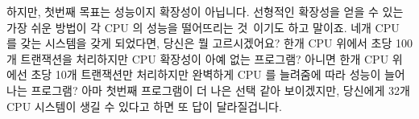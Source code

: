 
하지만, 첫번째 목표는 성능이지 확장성이 아닙니다. 선형적인 확장성을 얻을 수
있는 가장 쉬운 방법이 각 CPU 의 성능을 떨어뜨리는
것~\cite{LinusTorvalds2001a}이기도 하고 말이죠.
네개 CPU 를 갖는 시스템을 갖게 되었다면, 당신은 뭘 고르시겠어요?
한개 CPU 위에서 초당 100개 트랜잭션을 처리하지만 CPU 확장성이 아예 없는
프로그램?
아니면 한개 CPU 위에선 초당 10개 트랜잭션만 처리하지만 완벽하게 CPU 를 늘려줌에
따라 성능이 늘어나는 프로그램?
아마 첫번째 프로그램이 더 나은 선택 같아 보이겠지만, 당신에게 32개 CPU 시스템이
생길 수 있다고 하면 또 답이 달라질겁니다.


